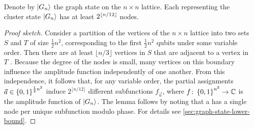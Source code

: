 \begin{lemma}
	\label{thm:graph-state-qmdd-lower-bound}
	Denote by $\ket{G_n}$ the graph state on the $n \times n$ lattice.
	Each \qmdd representing the cluster state $\ket{G_n}$ has at least $2^{\left\lfloor n/12 \right\rfloor}$ nodes.
\end{lemma}
\begin{proof}[Proof sketch]
	Consider a partition of the vertices of the $n\times n$ lattice into two sets $S$ and $T$ of size $\frac{1}{2}n^2$, corresponding to the first $\frac{1}{2}n^2$ qubits under some variable order.
	Then there are at least $\lfloor n/3 \rfloor$ vertices in $S$ that are adjacent to a vertex in $T$ \cite[Th. 11]{lipton1979generalized}.
	Because the degree of the nodes is small, many vertices on this boundary influence the amplitude function independently of one another.
	From this independence, it follows that, for any variable order,
	the partial assignments $\vec a \in \left\lbrace 0,1 \right\rbrace^{\frac{1}{2}n^2}$ induce
	$2^{\lfloor n/12 \rfloor}$ different subfunctions $f_{\vec a}$, where
	$f\colon \left\lbrace 0,1 \right\rbrace^{n^2} \rightarrow \mathbb C$
	is the amplitude function of $\ket{G_n}$.
	The lemma follows by noting that a \qmdd has a single node per unique subfunction modulo phase.
	For details see \autoref{sec:graph-state-lower-bound}.
\end{proof}


%
%
%

